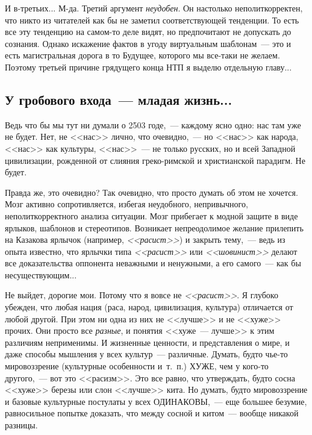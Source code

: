 \documentclass{scrbook}
\newcommand{\flqq}{<<}
\newcommand{\frqq}{>>}
\newcommand{\mdash}{~--- }
\newcommand{\commamdash}{~--- } %
\newcommand{\essaysection}[1]{\subsection*{#1}\nopagebreak}
\begin{document}
И в-третьих... М-да. Третий аргумент \emph{неудобен}. Он настолько неполиткорректен, что никто из читателей как бы не заметил соответствующей тенденции. То есть все эту тенденцию на самом-то деле видят, но предпочитают не допускать до сознания. Однако искажение фактов в угоду виртуальным шаблонам{\mdash}это и есть магистральная дорога в  то Будущее, которого мы все-таки не желаем. Поэтому третьей причине грядущего конца НТП я выделю отдельную главу...

\essaysection{У гробового входа{\mdash}младая жизнь...}

Ведь что бы мы тут ни думали о 2503 годе,{\commamdash}каждому ясно одно: нас там уже не будет. Нет, не {\flqq}нас{\frqq} лично, что очевидно,{\commamdash}но {\flqq}нас{\frqq} как народа, {\flqq}нас{\frqq} как культуры, {\flqq}нас{\frqq}{\mdash}не только русских, но и всей Западной цивилизации, рожденной от слияния греко-римской и христианской парадигм. Не будет.

Правда же, это очевидно? Так очевидно, что просто думать об этом не хочется. Мозг активно сопротивляется, избегая неудобного, непривычного, неполиткорректного анализа ситуации. Мозг прибегает к модной защите в виде ярлыков, шаблонов и стереотипов. Возникает непреодолимое желание прилепить на Казакова ярлычок (например, \emph{{\flqq}расист{\frqq}}) и закрыть тему,{\commamdash}ведь из опыта известно, что ярлычки типа \emph{{\flqq}расист{\frqq}} или \emph{{\flqq}шовинист{\frqq}} делают все доказательства оппонента неважными и ненужными, а его самого{\mdash}как бы несуществующим...

Не выйдет, дорогие мои. Потому что я вовсе не \emph{{\flqq}расист{\frqq}}. Я глубоко убежден, что любая нация (раса, народ, цивилизация, культура) отличается от любой другой. При этом ни одна из них не {\flqq}лучше{\frqq} и не {\flqq}хуже{\frqq} прочих. Они просто все \emph{разные}, и понятия {\flqq}хуже{\mdash}лучше{\frqq} к этим различиям неприменимы. И жизненные ценности, и представления о мире, и даже способы мышления у всех культур{\mdash}различные. Думать, будто чье-то мировоззрение (культурные особенности и~т.~п.) ХУЖЕ, чем у кого-то другого,{\commamdash}вот это {\flqq}расизм{\frqq}. Это все равно, что утверждать, будто сосна {\flqq}хуже{\frqq} березы или слон {\flqq}лучше{\frqq} кита. Но думать, будто мировоззрение и базовые культурные постулаты у всех ОДИНАКОВЫ,{\commamdash}еще большее безумие, равносильное попытке доказать, что между сосной и китом{\mdash}вообще никакой разницы.
\end{document}
